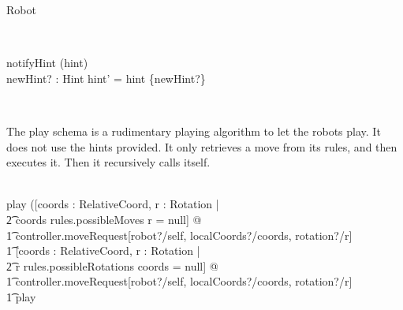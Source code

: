 \documentclass[12pt]{article}
\begin{document}
\begin{class}{Robot}
\begin{zpar}
\end{zpar} \\
\begin{schema}{notifyHint}
\Delta (hint) \\
newHint? : Hint
\where
hint' = hint \cup \{newHint?\}
\end{schema} \\
\znewpage
\begin{zpar}
The play schema is a rudimentary playing algorithm to let the robots play. It does not use the hints provided. It only retrieves a move from its rules, and then executes it. Then it recursively calls itself.
\end{zpar} \\
play \sdef ([coords : RelativeCoord, r : Rotation | \\ \t2 coords \in rules.possibleMoves \wedge r = null] @ \\ \t1 controller.moveRequest[robot?/self, localCoords?/coords, rotation?/r] \; \; [] \\ \t1
[coords : RelativeCoord, r : Rotation | \\ \t2 r \in rules.possibleRotations \wedge coords = null] @ \\ \t1 controller.moveRequest[robot?/self, localCoords?/coords, rotation?/r] \; \; \comp \\ \t1 play
\end{class}
\end{document}
